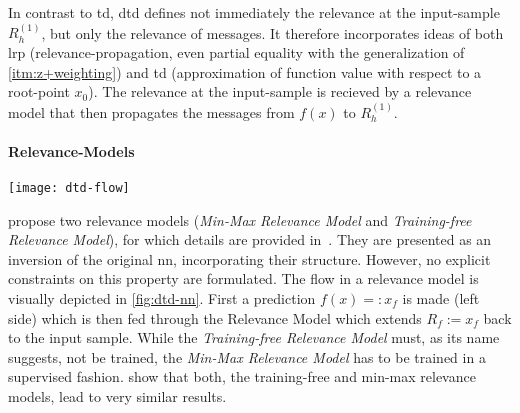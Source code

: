 \par
In contrast to \gls{td}, \gls{dtd} defines not immediately the relevance at the input-sample \(R_{h}^{(1)}\), but only the relevance of \glspl{message}. It therefore incorporates ideas of both \gls{lrp} (relevance-propagation, even partial equality with the generalization of \ref{itm:z+weighting}) and \gls{td} (approximation of function value with respect to a root-point \(x_0\)). The relevance at the input-sample is recieved by a relevance model that then propagates the \glspl{message} from \(f(x)\) to \(R_{h}^{(1)}\).
\paragraph{Relevance-Models}
\begin{figure*}[ht]
    \center{}
    \texttt{[image: dtd-flow]}
    \caption[Deeper Neural Network; prediction and propagation via \gls{dtd}]{\textbf{Left:} A neural network at prediction time. \textbf{Right:} exemplary \gls{dtd} Relevance Model, adopted from \protect\cite{Montavon.2017}. Note, that in this work, usually \(R_h\) is used instead of \(R_p\).}\label{fig:dtd-nn}
\end{figure*}
 propose two relevance models (\textit{Min-Max Relevance Model} and \textit{Training-free Relevance Model}), for which details are provided in~\cite{Montavon.2017}. They are presented as an inversion of the original \gls{nn}, incorporating their structure. However, no explicit constraints on this property are formulated. The flow in a relevance model is visually depicted in \cref{fig:dtd-nn}. First a prediction \(f(x)=:x_f\) is made (left side) which is then fed through the Relevance Model which extends \(R_f:=x_f\) back to the input sample. While the \textit{Training-free Relevance Model} must, as its name suggests, not be trained, the \textit{Min-Max Relevance Model} has to be trained in a supervised fashion.  show that both, the training-free and min-max relevance models, lead to very similar results.